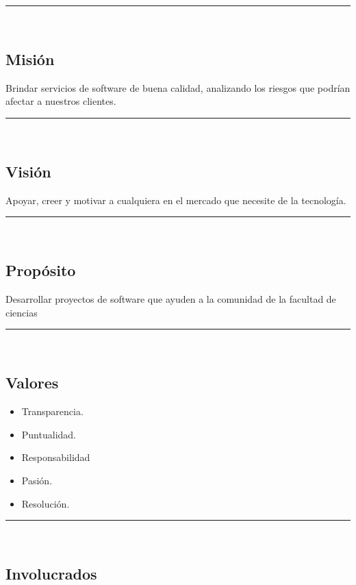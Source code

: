 \documentclass{article}
\begin{document}
\rule{0.8\textwidth}{.8pt}\\

\subsection*{Misión}
Brindar servicios de software de buena calidad, analizando los riesgos que
podrían afectar a nuestros clientes.

\rule{0.8\textwidth}{.8pt}\\

\subsection*{Visión}
Apoyar, creer y motivar a cualquiera en el mercado que necesite de la tecnología.

\rule{0.8\textwidth}{.8pt}\\

\subsection*{Propósito}
Desarrollar proyectos de software que ayuden a la comunidad de la facultad de ciencias

\rule{0.8\textwidth}{.8pt}\\

\subsection*{Valores}

\begin{itemize}
\item Transparencia.
\item Puntualidad.
\item Responsabilidad
\item Pasión.
\item Resolución.
\end{itemize}

\rule{0.8\textwidth}{.8pt}\\

\subsection*{Involucrados}
\end{document}
